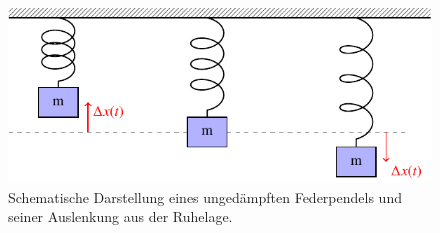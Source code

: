 %
%
%
\begin{figure}
\centering
\includegraphics{papers/fourier/images/federpendel.pdf}
\caption{Schematische Darstellung eines ungedämpften Federpendels und seiner Auslenkung aus der Ruhelage.%
\label{fourier:fig:federpendel}}
\end{figure}